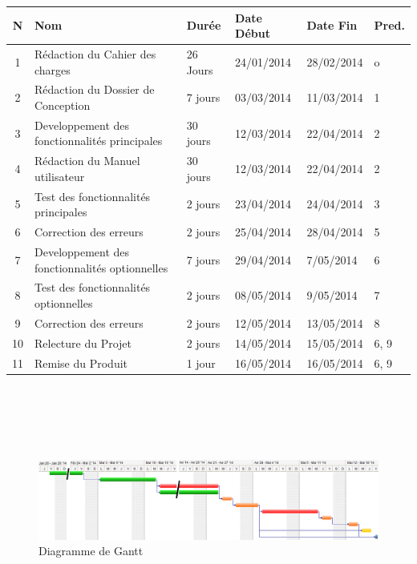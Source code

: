 \documentclass[11pt]{article}
\begin{document}
\vspace{0,5cm}
\small
\begin{tabular}{|c|l|l|l|l|l|}
    \hline
	\textbf{N} & \textbf{Nom} & \textbf{Durée} & \textbf{Date Début} & \textbf{Date Fin} & \textbf{Pred.}\\
	\hline
    \hline
		1 & Rédaction du Cahier des charges 					& 26 Jours 	& 24/01/2014 & 28/02/2014 	& o		\\ \cline{1-6}
		2 & Rédaction du Dossier de Conception 					& 7 jours 	& 03/03/2014 & 11/03/2014 	& 1  	\\	\cline{1-6}	
    	3 & Developpement des fonctionnalités principales		& 30 jours 	& 12/03/2014 & 22/04/2014 	& 2 	\\	\cline{1-6}	
		4 & Rédaction du Manuel utilisateur 					& 30 jours 	& 12/03/2014 & 22/04/2014 	& 2  	\\	\cline{1-6}	
		5 & Test des fonctionnalités principales				& 2 jours 	& 23/04/2014 & 24/04/2014 	& 3  	\\	\cline{1-6}
        6 & Correction des erreurs 								& 2 jours 	& 25/04/2014 & 28/04/2014 	& 5		\\ \cline{1-6}
        7 & Developpement des fonctionnalités optionnelles 		& 7 jours 	& 29/04/2014 & 7/05/2014 	& 6 	\\ \cline{1-6}
        8 & Test des fonctionnalités optionnelles 				& 2 jours 	& 08/05/2014 & 9/05/2014 	& 7 	\\ \cline{1-6}
        9 & Correction des erreurs 								& 2 jours 	& 12/05/2014 & 13/05/2014 	& 8 	\\ \cline{1-6}
       10 & Relecture du Projet 								& 2 jours 	& 14/05/2014 & 15/05/2014 	& 6, 9 	\\ \cline{1-6}
       11 & Remise du Produit 									& 1 jour 	& 16/05/2014 & 16/05/2014 	& 6, 9 	\\ \cline{1-6}
	\hline
\end{tabular}
\normalsize \\
\\
\\
\\
\begin{figure}[!ht]
		\centering
		\includegraphics[width=17cm]{./Diagrammes/DiagrammeGantt.png}
		\caption{Diagramme de Gantt}
\end{figure}
\end{document}
